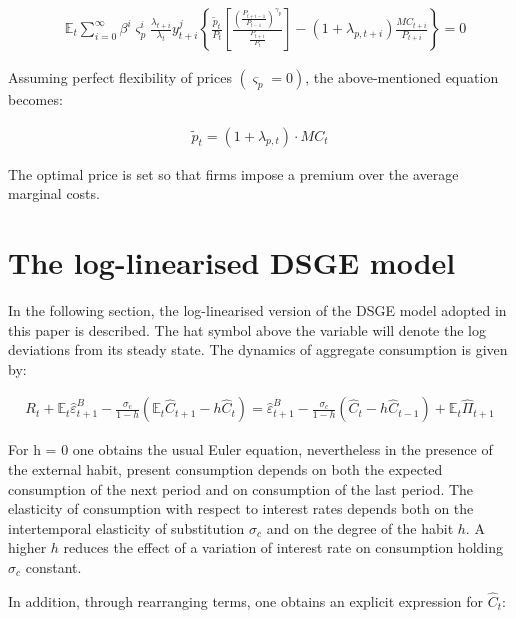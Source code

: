 \documentclass{pracamgr}
\numberwithin{equation}{section}
\begin{document}
\begin{align}
&\mathbb{E}_{t}  \sum\limits_{i=0}^{\infty} \beta^{i} \varsigma_{p}^{i} \frac{\lambda_{t+i}}{\lambda_{t}} y_{t+i}^{j} \left\{ \frac{\widetilde{p}_{t}}{P_{t}} \left[ \frac{ \left(\frac{P_{t+i-1}}{P_{t-1}} \right)^{\gamma_{p}}}{\frac{P_{t+i}}{P_{t}}} \right] - (1+\lambda_{p,t+i})\frac{MC_{t+i}}{P_{t+i}} \right\} = 0
\end{align}

Assuming perfect flexibility of prices $(\varsigma_{p} = 0)$, the above-mentioned equation becomes:

\begin{align}
\widetilde{p}_{t} = \left(1 + \lambda_{p, t} \right) \cdot MC_{t}
\end{align}

The optimal price is set so that firms impose a premium over the average marginal costs.

\section{The log-linearised DSGE model} \label{The log-linerised DSGE model}

In the following section, the log-linearised version of the DSGE model adopted in this paper is described. The hat symbol above the variable will denote the log deviations from its steady state. The dynamics of aggregate consumption is given by:

\begin{align}
R_{t} + \mathbb{E}_{t} \hat{\varepsilon}^{B}_{t+1} - \frac{\sigma_{c}}{1-h} \left( \mathbb{E}_{t}\hat{C}_{t+1} - h \hat{C}_{t} \right) = \hat{\varepsilon}^{B}_{t+1} - \frac{\sigma_{c}}{1-h} \left( \hat{C}_{t} - h \hat{C}_{t-1} \right) + \mathbb{E}_{t} \hat{\Pi}_{t+1}
\end{align}

For h = 0 one obtains the usual Euler equation, nevertheless in the presence of the external habit, present consumption depends on both the expected consumption of the next period and on consumption of the last period. The elasticity of consumption with respect to interest rates depends both on the intertemporal elasticity of substitution $\sigma_{c}$ and on the degree of the habit $h$. A higher $h$ reduces the effect of a variation of interest rate on consumption holding $\sigma_{c}$ constant.

In addition, through rearranging terms, one obtains an explicit expression for $\hat{C}_{t}$:
\end{document}
